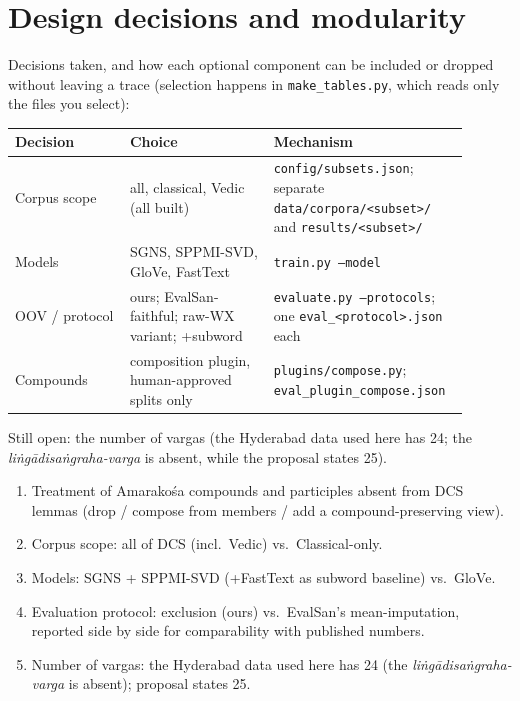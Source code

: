 \documentclass[11pt,a4paper]{article}
\theoremstyle{remark}\newtheorem{remark}{Remark}
\begin{document}
\section{Design decisions and modularity}\label{sec:decisions}
Decisions taken, and how each optional component can be included or dropped
without leaving a trace (selection happens in \texttt{make\_tables.py}, which
reads only the files you select):
\begin{center}\small
\begin{tabular}{p{0.24\linewidth}p{0.3\linewidth}p{0.36\linewidth}}
\toprule
Decision & Choice & Mechanism\\
\midrule
Corpus scope & all, classical, Vedic (all built) & \texttt{config/subsets.json};
separate \texttt{data/corpora/<subset>/} and \texttt{results/<subset>/}\\
Models & SGNS, SPPMI-SVD, GloVe, FastText & \texttt{train.py --model}\\
OOV / protocol & ours; EvalSan-faithful; raw-WX variant; +subword &
\texttt{evaluate.py --protocols}; one \texttt{eval\_<protocol>.json} each\\
Compounds & composition plugin, human-approved splits only &
\texttt{plugins/compose.py}; \texttt{eval\_plugin\_compose.json}\\
\bottomrule
\end{tabular}
\end{center}
Still open: the number of vargas (the Hyderabad data used here has 24; the
\emph{liṅgādisaṅgraha-varga} is absent, while the proposal states 25).

\begin{enumerate}[nosep]
\item Treatment of Amarakośa compounds and participles absent from DCS lemmas
  (drop / compose from members / add a compound-preserving view).
\item Corpus scope: all of DCS (incl.\ Vedic) vs.\ Classical-only.
\item Models: SGNS + SPPMI-SVD (+FastText as subword baseline) vs.\ GloVe.
\item Evaluation protocol: exclusion (ours) vs.\ EvalSan's mean-imputation,
  reported side by side for comparability with published numbers.
\item Number of vargas: the Hyderabad data used here has 24 (the
  \emph{liṅgādisaṅgraha-varga} is absent); proposal states 25.
\end{enumerate}
\end{document}
